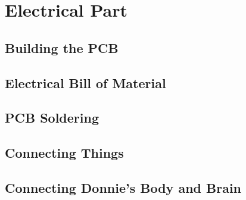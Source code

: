 \chapter{Electrical Part}

\section{Building the PCB}
\label{sec:pcb}

\section{Electrical Bill of Material}
\label{sec:elet_bom}

\section{PCB Soldering}
\label{sec:solder}

\section{Connecting Things}
\label{sec:connect}

\section{Connecting Donnie's Body and Brain}
\label{sec:connect2}

